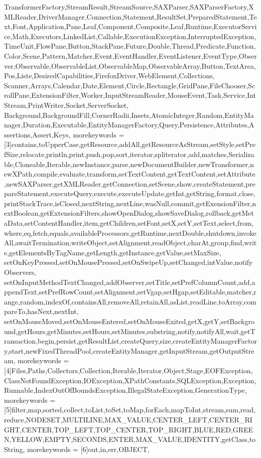 {{    TransformerFactory,StreamResult,StreamSource,SAXParser,SAXParserFactory,XMLReader,DriverManager,Connection,Statement,ResultSet,PreparedStatement,Text,Font,Application,Pane,Leaf,Component,Composite,Leaf,Runtime,ExecutorService,Math,Executors,LinkedList,Callable,ExecutionException,InterruptedException,TimeUnit,FlowPane,Button,StackPane,Future,Double,Thread,Predicate,Function,Color,Scene,Pattern,Matcher,Event,EventHandler,EventListener,EventType,Observer,Observable,ObservableList,ObservableMap,ObservableArray,Button,TextArea,Pos,Liste,DesiredCapabilities,FirefoxDriver,WebElement,Collections,%
    Scanner,Arrays,Calendar,Date,Element,Circle,Rectangle,GridPane,FileChooser,ScrollPane,ExtensionFilter,Worker,InputStreamReader,MouseEvent,Task,Service,IntStream,PrintWriter,Socket,ServerSocket,%
    Background,BackgroundFill,CornerRadii,Insets,AtomicInteger,Random,EntityManager,Duration,Executable,EntityManagerFactory,Query,Persistence,Attributes,Assertions,Assert,Keys},
    morekeywords = [3]{contains,toUpperCase,getResource,addAll,getResourceAsStream,setStyle,setPrefSize,relocate,println,print,push,pop,sort,iterator,spliterator,add,matches,Serializable,Cloneable,Iterable,newInstance,parse,newDocumentBuilder,newTransformer,newXPath,compile,evaluate,transform,setTextContent,getTextContent,setAttribute,newSAXParser,getXMLReader,getConnection,setScene,show,createStatement,prepareStatement,executeQuery,execute,executeUpdate,getInt,getString,format,close,printStackTrace,isClosed,nextString,nextLine,wasNull,commit,getExensionFilter,nextBoolean,getExtensionFilters,showOpenDialog,showSaveDialog,rollback,getMetaData,setContentHandler,item,getChildren,setFont,setX,setY,setText,select,from,where,eq,fetch,equals,availableProcessors,getRuntime,nextDouble,shutdown,invokeAll,awaitTermination,writeObject,setAlignment,readObject,charAt,group,find,write,getElementsByTagName,getLength,getInstance,getValue,setMaxSize,%
    setOnKeyPressed,setOnMousePressed,setOnSwipeUp,setChanged,intValue,notifyObservers, setOnInputMethodTextChanged,addObserver,setTitle,setPrefColumnCount,add,appendText,setPrefRowCount,setAlignment,setVgap,setHgap,setEditable,matcher,range,random,indexOf,containsAll,removeAll,retainAll,asList,readLine,toArray,compareTo,hasNext,nextInt,%
    setOnMouseMoved,setOnMouseEntered,setOnMouseExited,getX,getY,setBackground,getHours,getMinutes,setHours,setMinutes,substring,notify,notifyAll,wait,getTransaction,begin,persist,getResultList,createQuery,size,createEntityManagerFactory,start,newFixedThreadPool,createEntityManager,getInputStream,getOutputStream},
    morekeywords = [4]{Files,Paths,Collectors,Collection,Iterable,Iterator,Object,Stage,EOFException,ClassNotFoundException,IOException,XPathConstants,SQLException,Exception,Runnable,IndexOutOfBoundsException,IllegalStateException,GenerationType},
    morekeywords = [5]{filter,map,sorted,collect,toList,toSet,toMap,forEach,mapToInt,stream,sum,read,reduce,NODESET,MULTILINE,MAX_VALUE,CENTER_LEFT,CENTER_RIGHT,CENTER,TOP_LEFT,TOP_CENTER,TOP_RIGHT,BLUE,RED,GREEN,YELLOW,EMPTY,SECONDS,ENTER,MAX_VALUE,IDENTITY,getClass,toString},
    morekeywords = [6]{out,in,err,OBJECT},
}




